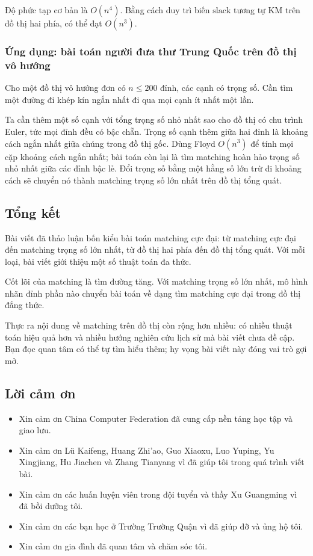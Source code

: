 \documentclass[11pt]{article}
\begin{document}
Độ phức tạp cơ bản là \(O(n^4)\). Bằng cách duy trì biến \(\mathrm{slack}\)
tương tự KM trên đồ thị hai phía, có thể đạt \(O(n^3)\).

\subsubsection{Ứng dụng: bài toán người đưa thư Trung Quốc trên đồ thị vô hướng}

Cho một đồ thị vô hướng đơn có \(n\le 200\) đỉnh, các cạnh có trọng số. Cần tìm
một đường đi khép kín ngắn nhất đi qua mọi cạnh ít nhất một lần.

Ta cần thêm một số cạnh với tổng trọng số nhỏ nhất sao cho đồ thị có chu trình
Euler, tức mọi đỉnh đều có bậc chẵn. Trọng số cạnh thêm giữa hai đỉnh là khoảng
cách ngắn nhất giữa chúng trong đồ thị gốc. Dùng Floyd \(O(n^3)\) để tính mọi
cặp khoảng cách ngắn nhất; bài toán còn lại là tìm matching hoàn hảo trọng số
nhỏ nhất giữa các đỉnh bậc lẻ. Đổi trọng số bằng một hằng số lớn trừ đi khoảng
cách sẽ chuyển nó thành matching trọng số lớn nhất trên đồ thị tổng quát.

\subsection{Tổng kết}

Bài viết đã thảo luận bốn kiểu bài toán matching cực đại: từ matching cực đại
đến matching trọng số lớn nhất, từ đồ thị hai phía đến đồ thị tổng quát. Với mỗi
loại, bài viết giới thiệu một số thuật toán đa thức.

Cốt lõi của matching là tìm đường tăng. Với matching trọng số lớn nhất, mô hình
nhãn đỉnh phần nào chuyển bài toán về dạng tìm matching cực đại trong đồ thị
đẳng thức.

Thực ra nội dung về matching trên đồ thị còn rộng hơn nhiều: có nhiều thuật
toán hiệu quả hơn và nhiều hướng nghiên cứu lịch sử mà bài viết chưa đề cập.
Bạn đọc quan tâm có thể tự tìm hiểu thêm; hy vọng bài viết này đóng vai trò gợi
mở.

\subsection{Lời cảm ơn}

\begin{itemize}
  \item Xin cảm ơn China Computer Federation đã cung cấp nền tảng học tập và
  giao lưu.
  \item Xin cảm ơn Lü Kaifeng, Huang Zhi'ao, Guo Xiaoxu, Luo Yuping, Yu
  Xingjiang, Hu Jiachen và Zhang Tianyang vì đã giúp tôi trong quá trình viết
  bài.
  \item Xin cảm ơn các huấn luyện viên trong đội tuyển và thầy Xu Guangming vì
  đã bồi dưỡng tôi.
  \item Xin cảm ơn các bạn học ở Trường Trường Quận vì đã giúp đỡ và ủng hộ tôi.
  \item Xin cảm ơn gia đình đã quan tâm và chăm sóc tôi.
\end{itemize}
\end{document}
